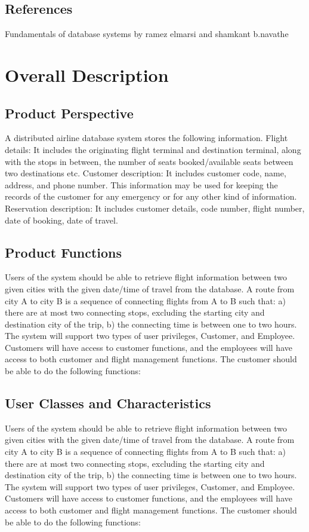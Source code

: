\documentclass{scrreprt}
\begin{document}
    \section{References} 
    Fundamentals of database systems by ramez elmarsi and shamkant b.navathe
    
    \chapter{Overall Description} 
    \section{Product Perspective}
    A distributed airline database system stores the following information.
Flight details:
It includes the originating flight terminal and destination terminal, along with the stops in between, the number of seats booked/available seats between two destinations etc.
Customer description:
It includes customer code, name, address, and phone number. This information may be used for keeping the records of the customer for any emergency or for any other kind of information.
Reservation description:
It includes customer details, code number, flight number, date of booking, date of travel.
    \section{Product Functions}
    Users of the system should be able to retrieve flight information between two given cities with the given date/time of travel from the database. A route from city A to city B is a sequence of connecting flights from A to B such that: a) there are at most two connecting stops, excluding the starting city and destination city of the trip, b) the connecting time is between one to two hours. The system will support two types of user privileges, Customer, and Employee. Customers will have access to customer functions, and the employees will have access to both customer and flight management functions. The customer should be able to do the following functions:
    \section{User Classes and Characteristics}
    Users of the system should be able to retrieve flight information between two given cities with the given date/time of travel from the database. A route from city A to city B is a sequence of connecting flights from A to B such that: a) there are at most two connecting stops, excluding the starting city and destination city of the trip, b) the connecting time is between one to two hours. The system will support two types of user privileges, Customer, and Employee. Customers will have access to customer functions, and the employees will have access to both customer and flight management functions. The customer should be able to do the following functions:
\end{document}
